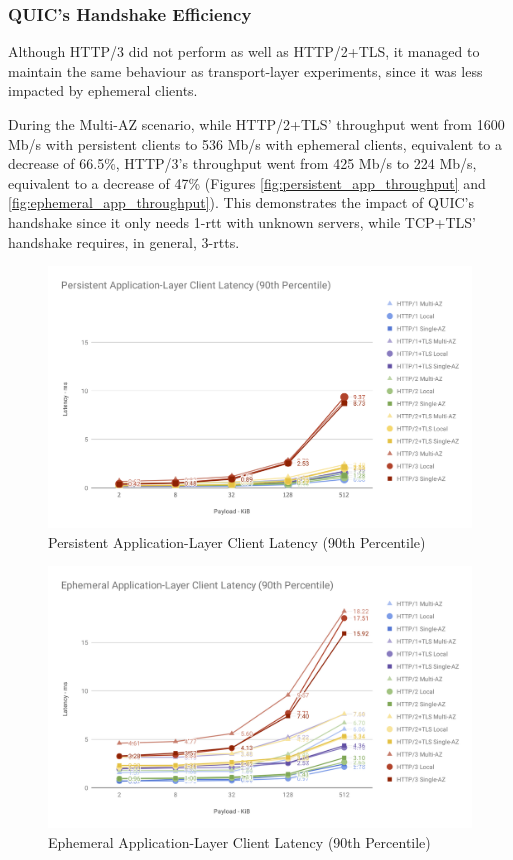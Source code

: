 \subsubsection*{QUIC's Handshake Efficiency}

Although HTTP/3 did not perform as well as HTTP/2+TLS, it managed to maintain the same behaviour as transport-layer experiments, since it was less impacted by ephemeral clients.

During the Multi-AZ scenario, while HTTP/2+TLS’ throughput went from 1600 Mb/s with persistent clients to 536 Mb/s with ephemeral clients, equivalent to a decrease of 66.5\%, HTTP/3’s throughput went from 425 Mb/s to 224 Mb/s, equivalent to a decrease of 47\% (Figures \ref{fig:persistent_app_throughput} and \ref{fig:ephemeral_app_throughput}). This demonstrates the impact of QUIC’s handshake since it only needs 1-\gls{rtt} with unknown servers, while TCP+TLS’ handshake requires, in general, 3-\gls{rtt}s.

\clearpage

\begin{figure}[h!]
    \centering
    \includegraphics[width=\linewidth]{figures/charts/Persistent Application-Layer Client Latency (90th Percentile).png}
    \caption{Persistent Application-Layer Client Latency (90th Percentile)}
    \label{fig:persistent_app_latency}
\end{figure}
\begin{figure}[h!]
    \centering
    \includegraphics[width=\linewidth]{figures/charts/Ephemeral Application-Layer Client Latency (90th Percentile).png}
    \caption{Ephemeral Application-Layer Client Latency (90th Percentile)}
    \label{fig:ephemeral_app_latency}
\end{figure}


